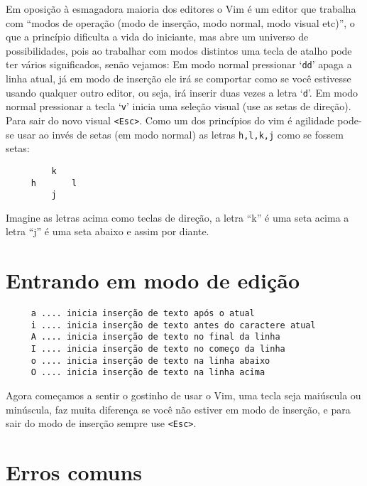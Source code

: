 Em oposição à esmagadora maioria dos editores o Vim é um editor que trabalha
com ``modos de operação (modo de inserção, modo normal, modo visual etc)'', o
que a princípio dificulta a vida do iniciante, mas abre um universo de
possibilidades, pois ao trabalhar com modos distintos uma tecla de atalho pode
ter vários significados, senão vejamos: Em modo normal pressionar `{\tt dd}'
apaga a linha atual, já em modo de inserção ele irá se comportar como se você
estivesse usando qualquer outro editor, ou seja, irá inserir duas vezes a letra
`{\tt d}'.  Em modo normal pressionar a tecla `{\tt v}' inicia uma seleção visual (use
as setas de direção).  Para sair do novo visual \verb|<Esc>|. 
Como um dos princípios do vim é agilidade pode-se usar ao invés de setas (em modo normal)
as letras {\tt h,l,k,j} como se fossem setas:

\begin{verbatim}
         k
     h       l
         j
\end{verbatim}

Imagine as letras acima como teclas de direção, a letra ``k'' é uma seta acima
a letra ``j'' é uma seta abaixo e assim por diante.

\section{Entrando em modo de edição}
\label{Entrando em modo de edição}

\begin{verbatim}
     a .... inicia inserção de texto após o atual
     i .... inicia inserção de texto antes do caractere atual
     A .... inicia inserção de texto no final da linha
     I .... inicia inserção de texto no começo da linha
     o .... inicia inserção de texto na linha abaixo
     O .... inicia inserção de texto na linha acima
\end{verbatim}

Agora começamos a sentir o gostinho de usar o Vim, uma tecla seja
maiúscula ou minúscula, faz muita diferença se você não estiver em
modo de inserção, e para sair do modo de inserção sempre use \verb|<Esc>|.


\section{Erros comuns}\label{sec:Erros comuns}

